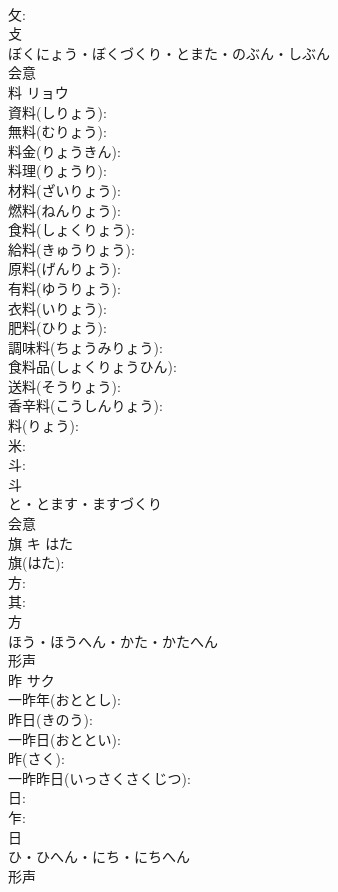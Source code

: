 \documentclass[8pt]{extreport}
\begin{document}
\begin{CJK}{UTF8}{min}
\\	攵: 
\\	攴	
\\	ぼくにょう・ぼくづくり・とまた・のぶん・しぶん	
\\	会意 
\\	料	リョウ			
\\	資料(しりょう): 
\\	無料(むりょう): 
\\	料金(りょうきん): 
\\	料理(りょうり): 
\\	材料(ざいりょう): 
\\	燃料(ねんりょう): 
\\	食料(しょくりょう): 
\\	給料(きゅうりょう): 
\\	原料(げんりょう): 
\\	有料(ゆうりょう): 
\\	衣料(いりょう): 
\\	肥料(ひりょう): 
\\	調味料(ちょうみりょう): 
\\	食料品(しょくりょうひん): 
\\	送料(そうりょう): 
\\	香辛料(こうしんりょう): 
\\	料(りょう): 
\\	米: 
\\	斗: 
\\	斗	
\\	と・とます・ますづくり	
\\	会意 
\\	旗	キ	はた		
\\	旗(はた): 
\\	方: 
\\	其: 
\\	方	
\\	ほう・ほうへん・かた・かたへん	
\\	形声 
\\	昨	サク			
\\	一昨年(おととし): 
\\	昨日(きのう): 
\\	一昨日(おととい): 
\\	昨(さく): 
\\	一昨昨日(いっさくさくじつ): 
\\	日: 
\\	乍: 
\\	日	
\\	ひ・ひへん・にち・にちへん	
\\	形声 

\end{CJK}
\end{document}

